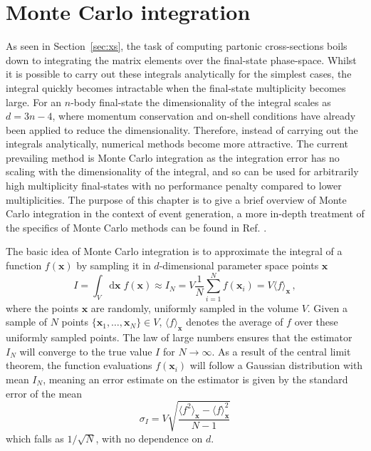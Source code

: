 \documentclass[main.tex]{subfiles}
\begin{document}
    \section{Monte Carlo integration}\label{sec:MC_integration}
    As seen in Section~\ref{sec:xs}, the task of
    computing partonic cross-sections boils down
    to integrating the matrix elements over the
    final-state phase-space. Whilst it is possible to
    carry out these integrals analytically for the simplest
    cases, the integral quickly becomes intractable when the
    final-state multiplicity becomes large. For an $n$-body
    final-state the dimensionality of the integral scales as $d=3n-4$,
    where momentum conservation and on-shell conditions
    have already been applied to reduce the dimensionality.
    Therefore, instead of carrying out the integrals analytically,
    numerical methods become more attractive. The current
    prevailing method is Monte Carlo integration as the
    integration error has no scaling with the dimensionality of the integral,
    and so can be used for arbitrarily high multiplicity final-states
    with no performance penalty compared to lower multiplicities.
    The purpose of this chapter is to give a brief overview
    of Monte Carlo integration in the context of event
    generation, a more in-depth treatment of the
    specifics of Monte Carlo methods can be found in Ref.
    \cite{James:1980yn}.

    The basic idea of Monte Carlo integration is to approximate
    the integral of a function $f(\mathbf{x})$ by sampling it
    in $d$-dimensional parameter space points $\mathbf{x}$
    \begin{equation}\label{eqn:MC_integration}
        I = \int_{V} \mathrm{d}\mathbf{x} \; f(\mathbf{x}) \approx I_{N} = V \dfrac{1}{N} \sum_{i=1}^{N} f(\mathbf{x}_{i}) = V \langle f \rangle_{\mathbf{x}} \, ,
    \end{equation}
    where the points $\mathbf{x}$ are randomly,
    uniformly sampled in the volume $V$. Given a sample of $N$
    points $\{\mathbf{x}_{1}, \ldots, \mathbf{x}_{N}\} \in V$,
    $\langle f \rangle_{\mathbf{x}}$
    denotes the average of $f$ over these uniformly sampled
    points. The law of large numbers ensures that the
    estimator $I_{N}$ will converge to
    the true value $I$ for $N \rightarrow \infty$. As a
    result of the central limit theorem, the function evaluations
    $f(\mathbf{x}_{i})$ will follow a Gaussian distribution with
    mean $I_{N}$,
    meaning an error estimate on the estimator is given by
    the standard error of the mean
    \begin{equation}\label{eqn:MC_error}
        \sigma_{I} = V \sqrt{\dfrac{\langle f^{2} \rangle_{\mathbf{x}} - \langle f \rangle_{\mathbf{x}}^{2}}{N-1}}
    \end{equation}
    which falls as $1/\sqrt{N}$, with no dependence
    on $d$.
\end{document}
